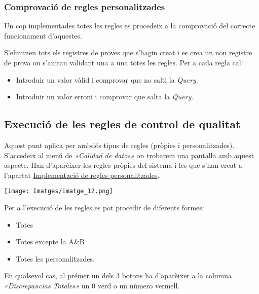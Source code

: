 \documentclass[
]{article}
\providecommand{\tightlist}{%
  \setlength{\itemsep}{0pt}\setlength{\parskip}{0pt}}
\begin{document}
\hypertarget{comprovaciuxf3-de-regles-personalitzades}{%
\subsubsection{\texorpdfstring{\textbf{Comprovació de regles personalitzades}}{Comprovació de regles personalitzades}}\label{comprovaciuxf3-de-regles-personalitzades}}

Un cop implementades totes les regles es procedeix a la comprovació del correcte funcionament d'aquestes.

S'eliminen tots els registres de proves que s'hagin creat i es crea un nou registre de prova on s'aniran validant una a una totes les regles. Per a cada regla cal:

\begin{itemize}
\tightlist
\item
  Introduir un valor vàlid i comprovar que no salti la \emph{Query}.
\item
  Introduir un valor erroni i comprovar que salta la \emph{Query}.
\end{itemize}

\hypertarget{en5}{%
\subsection{\texorpdfstring{\textbf{Execució de les regles de control de qualitat}}{Execució de les regles de control de qualitat}}\label{en5}}

Aquest punt aplica per ambdós tipus de regles (pròpies i personalitzades).
S'accedeix al menú de \emph{«Calidad de datos»} on trobarem una pantalla amb aquest aspecte. Han d'aparèixer les regles pròpies del sistema i les que s'han creat a l'apartat \protect\hyperlink{en6}{Implementació de regles personalitzades}.

\texttt{[image: Imatges/imatge\_12.png]}

Per a l'execució de les regles es pot procedir de diferents formes:

\begin{itemize}
\tightlist
\item
  Totes
\item
  Totes excepte la A\&B
\item
  Totes les personalitzades.
\end{itemize}

En qualsevol cas, al prémer un dels 3 botons ha d'aparèixer a la columna \emph{«Discrepancias Totales»} un 0 verd o un número vermell.
\end{document}

